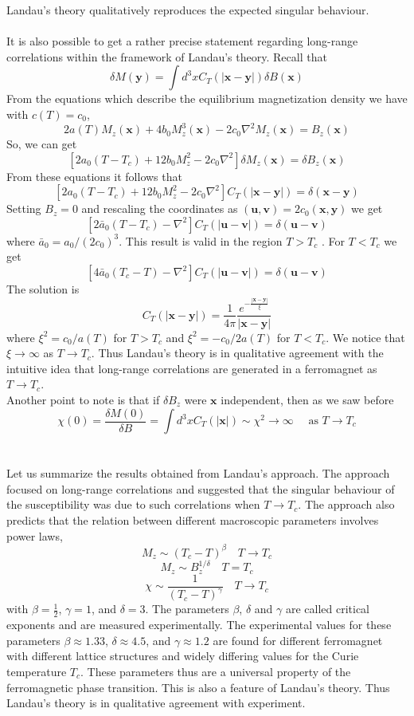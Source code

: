 \documentclass[cyan]{elegantnote}
\begin{document}
Landau's theory qualitatively reproduces the expected singular behaviour.
\\ \\
It is also possible to get a rather precise statement regarding long-range correlations within the framework of Landau's theory. Recall that
\[\delta M(\bm{y}) = \int d^3x C_T(|\bm{x}-\bm{y}|)\delta B(\bm{x})\]
From the equations which describe the equilibrium magnetization density we have with $c(T) = c_0$,
\[2a(T)M_z(\bm{x}) + 4b_0M_z^3(\bm{x})- 2c_0\nabla^2M_z(\bm{x}) = B_z(\bm{x})\]
So, we can get
\[[2a_0(T-T_c) + 12b_0M_z^2 - 2c_0\nabla^2] \delta M_z(\bm{x}) = \delta B_z(\bm{x})\]
From these equations it follows that
\[[2a_0(T-T_c) + 12b_0M_z^2 - 2c_0\nabla^2]C_T(|\bm{x} - \bm{y}|) = \delta(\bm{x} - \bm{y}) \]
Setting $B_z = 0$ and rescaling the coordinates as $(\bm{u},\bm{v}) = 2c_0(\bm{x},\bm{y})$ we get
\[[2\bar{a}_0(T-T_c) - \nabla^2] C_T(|\bm{u} - \bm{v}|) = \delta(\bm{u} - \bm{v})\]
where $\bar{a}_0 = a_0/(2c_0)^3$.
This result is valid in the region $T > T_c$ . For $T < T_c$ we get
\[[4\bar{a}_0(T_c-T) - \nabla^2] C_T(|\bm{u} - \bm{v}|) = \delta(\bm{u} - \bm{v})\]
The solution is
\[C_T(|\bm{x} - \bm{y}|) = \frac{1}{4\pi} \frac{e^{-\frac{|\bm{x} - \bm{y}|}{\xi}}}{|\bm{x} - \bm{y}|}\]
where $\xi^2 = c_0/a(T)$ for $T > T_c$ and $\xi^2 = -c_0/2a(T)$ for $T < T_c$.
We notice that $\xi \to \infty$ as $T \to T_c$. Thus Landau's theory is in qualitative agreement with the intuitive idea that long-range correlations are generated in a ferromagnet as $T \to T_c$.
\\
Another point to note is that if $\delta B_z$ were $\bm{x}$ independent, then as we saw before
\[\chi(0) = \frac{\delta M(0)}{\delta B} = \int d^3x C_T(|\bm{x}|) \sim \chi^2 \to \infty \quad \mbox{ as } T \to T_c\]
\\ \\
Let us summarize the results obtained from Landau's approach. The approach focused on long-range correlations and suggested that the singular behaviour of the susceptibility was due to such correlations when $T \to T_c$. 
The approach also predicts that the relation between different macroscopic parameters involves power laws,
\[M_z \sim (T_c - T)^{\beta} \quad T \to T_c\]
\[M_z \sim B_z^{1/\delta} \quad T = T_c\]
\[\chi \sim \frac{1}{(T_c-T)^{\gamma}} \quad T \to T_c\]
with $\beta = \frac{1}{2}$, $\gamma = 1$, and $\delta = 3$. The parameters $\beta$, $\delta$ and $\gamma$ are called critical exponents and are measured experimentally. 
The experimental values for these parameters
$\beta \approx 1.33$, $\delta \approx 4.5$, and $\gamma \approx 1.2$ are found for different ferromagnet with different lattice structures and widely differing values for the Curie temperature $T_c$. 
These parameters thus are a universal property of the ferromagnetic phase transition. This is also a feature of Landau's theory. Thus Landau's theory is in qualitative
agreement with experiment.
\end{document}
